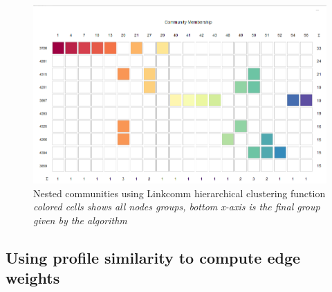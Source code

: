 \documentclass[11pt]{article}       %
\begin{document}
\begin{figure}[H]
\centering
  \includegraphics[width=\linewidth]{nested.PNG}
    \caption{Nested communities using Linkcomm hierarchical clustering function \newline\textit{colored cells shows all nodes groups, bottom x-axis is the final group given by the algorithm}}
\end{figure}


\newpage

\subsection{Using profile similarity to compute edge weights}
\end{document}
